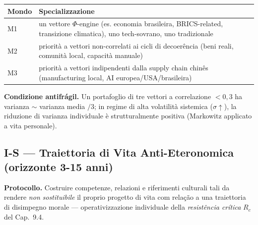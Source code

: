 {\def\LTcaptype{none} %
{\small\begin{longtable}[]{@{}
  >{\raggedright\arraybackslash}p{}
  >{\raggedright\arraybackslash}p{}@{}}
\toprule\noalign{}
\begin{minipage}[b]{\linewidth}\raggedright
Mondo
\end{minipage} & \begin{minipage}[b]{\linewidth}\raggedright
Specializzazione
\end{minipage} \\
\midrule\noalign{}
\endhead
\bottomrule\noalign{}
\endlastfoot
M1 & un vettore \(\Phi\)-engine (es. economia brasileira, BRICS-related,
transizione climatica), uno tech-sovrano, uno tradizionale \\
M2 & priorità a vettori non-correlati ai cicli di decoerência (beni
reali, comunità local, capacità manuale) \\
M3 & priorità a vettori indipendenti dalla supply chain chinês
(manufacturing local, AI europea/USA/brasileira) \\
\end{longtable}}
}

\Proved{} \textbf{Condizione antifrágil.} Un portafoglio di tre vettori
a correlazione \(< 0{,}3\) ha varianza \(\sim\) varianza media \(/ 3\);
in regime di alta volatilità sistemica (\(\sigma \uparrow\)), la
riduzione di varianza individuale è strutturalmente positiva (Markowitz
applicato a vita personale).

\subsection{I-S --- Traiettoria di Vita Anti-Eteronomica (orizzonte 3-15
anni)}\label{i-s-traiettoria-di-vita-anti-eteronomica-orizzonte-3-15-anni}

\Hypoth{} \textbf{Protocollo.} Costruire competenze, relazioni e
riferimenti culturali tali da rendere \emph{non sostituibile} il proprio
progetto di vita com relação a una traiettoria di disimpegno morale ---
operativizzazione individuale della \emph{resistência crítica} \(R_c\)
del Cap.~9.4.

